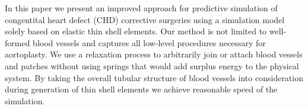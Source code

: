In this paper we present an improved approach for predictive simulation of congentital heart defect (CHD) corrective surgeries using a simulation model solely based on elastic thin shell elements. Our method is not limited to well-formed blood vessels and captures all low-level procedures necessary for aortoplasty. We use a relaxation process to arbitrarily join or attach blood vessels and patches without using springs that would add surplus energy to the physical system. By taking the overall tubular structure of blood vessels into consideration during generation of thin shell elements we achieve reasonable speed of the simulation.


